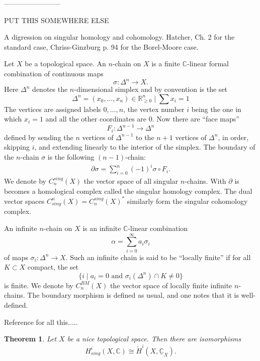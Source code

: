 \documentclass[12pt]{article}
\theoremstyle{plain}
\newtheorem{thm}{Theorem}[section]
\theoremstyle{definition}
\numberwithin{equation}{section}
\newcommand{\C}{\mathbb{C}}
\newcommand{\R}{\mathbb{R}}
\begin{document}
------------------------

PUT THIS SOMEWHERE ELSE



A digression on singular homology and cohomology. Hatcher, Ch. 2 for the standard case, Chriss-Ginzburg p. 94 for the Borel-Moore case.



Let $X$ be a topological space. An $n$-chain on $X$ is a finite $\C$-linear formal combination of continuous maps
\[
\sigma : \Delta^n \rightarrow X.
\]
Here $\Delta^n$ denotes the $n$-dimensional simplex and by convention is the set
\[
\Delta^n = {(x_0, \ldots, x_n) \in \R_{\geq 0}^n \mid \sum x_i = 1}
\]
The vertices are assigned labels $0, \ldots, n$, the vertex number $i$ being the one in which $x_i = 1$ and all the other coordinates are $0$. Now there are ``face maps''
\[
F_i : \Delta^{n-1} \rightarrow \Delta^n
\]
defined by sending the $n$ vertices of $\Delta^{n-1}$ to the $n+1$ vertices of $\Delta^{n}$, in order, skipping $i$, and extending linearly to the interior of the simplex. The boundary of the $n$-chain $\sigma$ is the following $(n-1)$-chain:
\begin{align*}
\partial \sigma = \sum_{i=0}^n (-1)^{i} \sigma \circ F_i.
\end{align*}
We denote by $C^{sing}_n(X)$ the vector space of all singular $n$-chains. With $\partial$ is becomes a homological complex called the singular homology complex. The dual vector spaces $C_{sing}^n(X) = C^{sing}_n(X)^*$ similarly form the singular cohomology complex.


An infinite $n$-chain on $X$ is an infinite $\C$-linear combination
\[
\alpha = \sum_{i=0}^\infty a_i \sigma_i
\]
of maps $\sigma_i : \Delta^n \rightarrow X$. Such an infinite chain is said to be ``locally finite'' if for all $K \subset X$ compact, the set
\[
\{i \mid \text{$a_i = 0$ and $\sigma_i(\Delta^n) \cap K \neq 0$} \}
\]
is finite. We denote by $C^{BM}_n(X)$ the vector space of locally finite infinite $n$-chains. The boundary morphism is defined as usual, and one notes that it is well-defined.




Reference for all this.....
\begin{thm}
Let $X$ be a nice topological space. Then there are isomorphisms
\[
H^i_{sing}(X, \C) \cong \check{H}^i(X, \underline{\C}_X).
\]
\end{thm}
\end{document}
